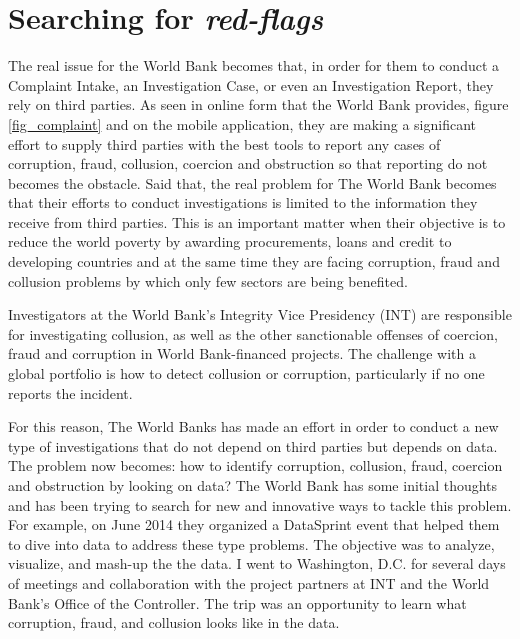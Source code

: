 \section{Searching for \textit{red-flags}}

The real issue for the World Bank becomes that, in order for them to conduct a Complaint Intake, an Investigation Case, or even an Investigation Report, they rely on third parties. As seen in online form that the World Bank provides, figure  \ref{fig_complaint} and on the mobile application, they are making a significant effort to supply third parties with the best tools to report any cases of corruption, fraud, collusion, coercion and  obstruction so that reporting do not becomes the obstacle. Said that, the real problem for The World Bank becomes that their efforts to conduct investigations is limited to the information they receive from third parties. This is an important matter when their objective is to reduce the world poverty by awarding procurements, loans and credit to developing countries and at the same time they are facing corruption, fraud and collusion problems by which only few sectors are being benefited.

Investigators at the World Bank's Integrity Vice Presidency (INT) are responsible for investigating collusion, as well as the other sanctionable offenses of coercion, fraud and corruption in World Bank-financed projects. The challenge with a global portfolio is how to detect collusion or corruption, particularly if no one reports the incident.

For this reason, The World Banks has made an effort in order to conduct a new type of investigations that do not depend on third parties but depends on data. The problem now becomes: how to identify corruption, collusion, fraud, coercion and obstruction by looking on data? The World Bank has some initial thoughts and has been trying to search for new and innovative ways to tackle this problem. For example, on June 2014 they organized a DataSprint event that helped them to dive into data to address these type problems. The objective was to analyze, visualize, and mash-up the the data. I went to Washington, D.C. for several days of meetings and collaboration with the project partners at INT and the World Bank's Office of the Controller. The trip was an opportunity to learn what corruption, fraud, and collusion looks like in the data.

